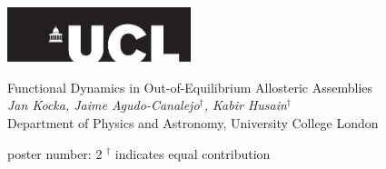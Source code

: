 \documentclass[10pt,mathserif]{beamer}
\begin{document}
\setlength{\abovedisplayskip}{1em}
\setlength{\belowdisplayskip}{0ex}

\begin{frame}
	\begin{flushright}
		\includegraphics[width=0.4\textwidth]{figures/UCL_logo.pdf} \\
	\end{flushright}

	\vspace{2em}
	\LARGE
	Functional Dynamics in Out-of-Equilibrium Allosteric Assemblies \\
	\normalsize
	\vspace{1.5em}
	\small
	\emph{Jan Kocka, Jaime Agudo-Canalejo$^\dagger$, Kabir Husain$^\dagger$} \\
	\scriptsize
	Department of Physics and Astronomy, University College London \\
	\vspace{7em}

	\normalsize
	poster number: 2 \hfill
	\tiny $^\dagger$ indicates equal contribution

	\vfill
\end{frame}
\end{document}
